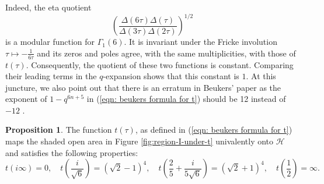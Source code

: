 \documentclass[12pt, a4paper]{amsart}
\theoremstyle{definition}
\numberwithin{theorem}{section}
\newtheorem{proposition}[theorem]{Proposition}
\begin{document}
Indeed, the eta quotient
\[\left(\frac{\Delta\left(6\tau\right)\Delta\left(\tau\right)}{\Delta\left(3\tau\right)\Delta\left(2\tau\right)}\right)^{1/2}\]
is a modular function for \(\Gamma_1\left(6\right)\). It is invariant under the Fricke involution $\tau\mapsto -\frac{1}{6\tau}$ and its zeros and poles agree, with the same multiplicities, with those of \(t\left(\tau\right)\). Consequently, the quotient of these two functions is constant. Comparing their leading terms in the \(q\)-expansion shows that this constant is \(1\). At this juncture, we also point out that there is an erratum in Beukers' paper as the exponent of $1-q^{6n+5}$ in (\ref{eqn: beukers formula for t}) should be 12 instead of $-12$ \cite{Beukers1987}.
\begin{proposition}
The function $t\left(\tau\right)$, as defined in (\ref{eqn: beukers formula for t}) maps the shaded open area in Figure \ref{fig:region-I-under-t} univalently onto $\mathcal{H}$ and satisfies the following properties: \[t\left(i\infty\right)=0,\quad t\left(\frac{i}{\sqrt{6}}\right)=\left(\sqrt{2}-1\right)^4,\quad t\left(\frac{2}{5}+\frac{i}{5\sqrt{6}}\right)=\left(\sqrt{2}+1\right)^4,\quad t\left(\frac{1}{2}\right)=\infty.\]
\end{proposition}
\end{document}
